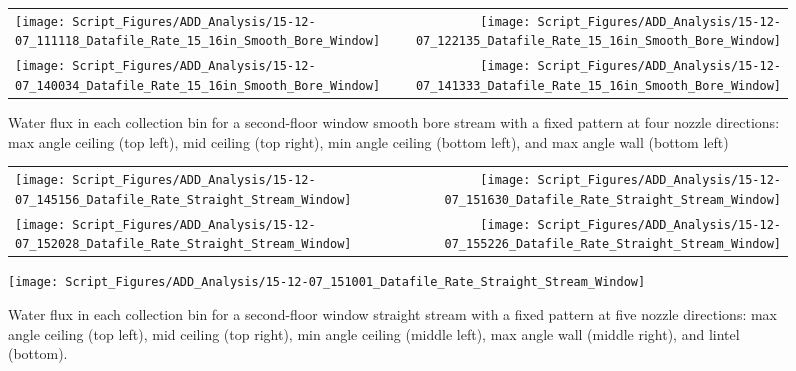 \documentclass[12pt,oneside]{book}
\begin{document}
\begin{figure}[ht]
\begin{tabular*}{\textwidth}{lr}
\texttt{[image: Script\_Figures/ADD\_Analysis/15-12-07\_111118\_Datafile\_Rate\_15\_16in\_Smooth\_Bore\_Window]} &
\texttt{[image: Script\_Figures/ADD\_Analysis/15-12-07\_122135\_Datafile\_Rate\_15\_16in\_Smooth\_Bore\_Window]} \\
\texttt{[image: Script\_Figures/ADD\_Analysis/15-12-07\_140034\_Datafile\_Rate\_15\_16in\_Smooth\_Bore\_Window]} &
\texttt{[image: Script\_Figures/ADD\_Analysis/15-12-07\_141333\_Datafile\_Rate\_15\_16in\_Smooth\_Bore\_Window]} \\
\end{tabular*}
\caption[Water Flux for Varying Nozzle Direction with Fixed Second Floor Window Smooth Bore Stream]{Water flux in each collection bin for a second-floor window smooth bore stream with a fixed pattern at four nozzle directions: max angle ceiling (top left), mid ceiling (top right), min angle ceiling (bottom left), and max angle wall (bottom left)}
\label{fig:Window_Second_Floor_Varying_Nozzle_Directions_SB_Fixed_Pattern}
\end{figure}

\begin{figure}[ht]
\begin{tabular*}{\textwidth}{lr}
\texttt{[image: Script\_Figures/ADD\_Analysis/15-12-07\_145156\_Datafile\_Rate\_Straight\_Stream\_Window]} &
\texttt{[image: Script\_Figures/ADD\_Analysis/15-12-07\_151630\_Datafile\_Rate\_Straight\_Stream\_Window]} \\
\texttt{[image: Script\_Figures/ADD\_Analysis/15-12-07\_152028\_Datafile\_Rate\_Straight\_Stream\_Window]} &
\texttt{[image: Script\_Figures/ADD\_Analysis/15-12-07\_155226\_Datafile\_Rate\_Straight\_Stream\_Window]} \\
\end{tabular*}
\centering
\texttt{[image: Script\_Figures/ADD\_Analysis/15-12-07\_151001\_Datafile\_Rate\_Straight\_Stream\_Window]}
\caption[Water Flux for Varying Nozzle Direction with Fixed Second Floor Window Straight Stream]{Water flux in each collection bin for a second-floor window straight stream with a fixed pattern at five nozzle directions: max angle ceiling (top left), mid ceiling (top right), min angle ceiling (middle left), max angle wall (middle right), and lintel (bottom).}
\label{fig:Window_Second_Floor_Varying_Nozzle_Directions_SS_Fixed_Pattern}
\end{figure}
\end{document}
